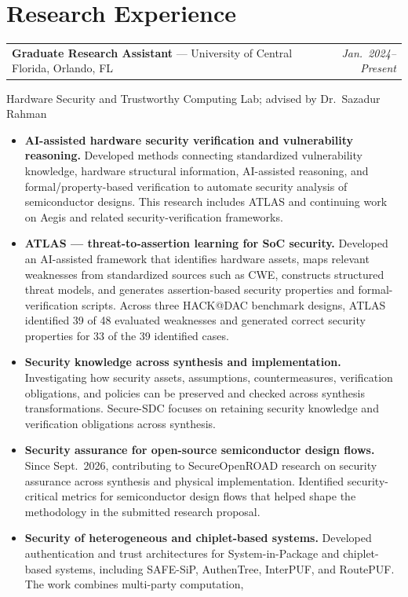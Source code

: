 \documentclass[11pt,letterpaper]{article}
\makeatletter
\newcommand{\entry}[2]{\par\noindent
  \begin{tabularx}{\textwidth}{@{}>{\raggedright\arraybackslash}X@{\hspace{1em}}r@{}}
    #1 & \textit{#2}
  \end{tabularx}\par}
\newcommand{\subnote}[1]{{\color{cvgray}#1}\par}
\makeatother
\begin{document}
\section*{Research Experience}
\entry{\textbf{Graduate Research Assistant} --- University of Central Florida, Orlando, FL}{Jan.\ 2024--Present}
\subnote{Hardware Security and Trustworthy Computing Lab; advised by Dr.\ Sazadur Rahman}
\begin{itemize}
  \item \textbf{AI-assisted hardware security verification and vulnerability reasoning.}
  Developed methods connecting standardized vulnerability knowledge, hardware structural
  information, AI-assisted reasoning, and formal/property-based verification to automate security
  analysis of semiconductor designs. This research includes ATLAS and continuing work on Aegis and
  related security-verification frameworks.
  \item \textbf{ATLAS --- threat-to-assertion learning for SoC security.}
  Developed an AI-assisted framework that identifies hardware assets, maps relevant weaknesses from
  standardized sources such as CWE, constructs structured threat models, and generates
  assertion-based security properties and formal-verification scripts. Across three HACK@DAC
  benchmark designs, ATLAS identified 39 of 48 evaluated weaknesses and generated correct security
  properties for 33 of the 39 identified cases.
  \item \textbf{Security knowledge across synthesis and implementation.}
  Investigating how security assets, assumptions, countermeasures, verification obligations, and
  policies can be preserved and checked across synthesis transformations. Secure-SDC focuses on
  retaining security knowledge and verification obligations across synthesis.
  \item \textbf{Security assurance for open-source semiconductor design flows.}
  Since Sept.\ 2026, contributing to SecureOpenROAD research on security assurance across synthesis
  and physical implementation. Identified security-critical metrics for semiconductor design flows
  that helped shape the methodology in the submitted research proposal.
  \item \textbf{Security of heterogeneous and chiplet-based systems.}
  Developed authentication and trust architectures for System-in-Package and chiplet-based systems,
  including SAFE-SiP, AuthenTree, InterPUF, and RoutePUF. The work combines multi-party computation,

\end{itemize}
\end{document}
